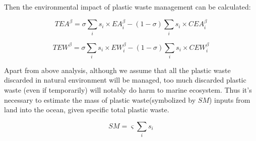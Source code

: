 \documentclass{mcmthesis}
\begin{document}

Then the environmental impact of plastic waste management can be calculated:

\begin{equation}
TEA^\beta = \sigma\sum_i{s_i}\times EA_i^\beta - (1 - \sigma)\sum_i{s_i}\times CEA_i^\beta
\label{EAB}
\end{equation}

\begin{equation}
TEW^\beta = \sigma\sum_i{s_i}\times EW_i^\beta - (1 - \sigma)\sum_i{s_i}\times CEW_i^\beta
\label{EWB}
\end{equation}


Apart from above analysis, although we assume that all the plastic waste discarded in natural environment will be managed, too much discarded plastic waste (even if temporarily) will notably do harm to marine ecosystem\cite{LI}. Thus it’s necessary to estimate the mass of plastic waste(symbolized by $SM$) inputs from land into the ocean, given specific total plastic waste.

\begin{equation}
SM = \varsigma\sum_i{s_i}
\label{SM}
\end{equation}

\end{document}
